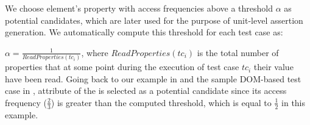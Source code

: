We choose element's property with access frequencies above a threshold $\alpha$ as potential candidates, which are later used for the purpose of unit-level assertion generation. We automatically compute this threshold for each test case as: 

$\alpha=\frac{1}{ReadProperties(tc_i)}$, where $ReadProperties(tc_i)$ is the total number of properties that at some point during the execution of test case $tc_i$ their value have been read.
Going back to our example in  and the sample DOM-based test case in ,  attribute of the  is selected as a potential candidate since its access frequency ($\frac{2}{3}$) is greater than the computed threshold, which is equal to $\frac{1}{2}$ in this example.        
